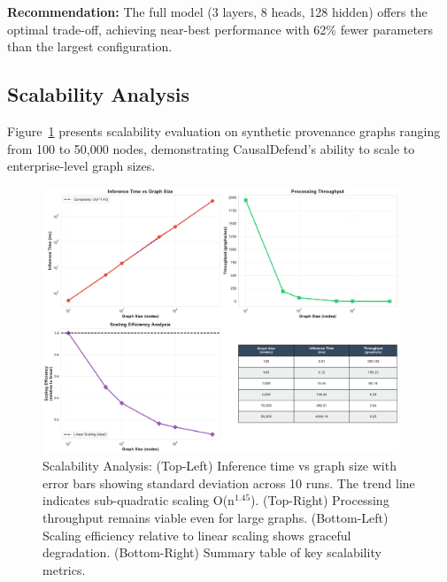 \documentclass[conference]{IEEEtran}
\begin{document}
\textbf{Recommendation:} The full model (3 layers, 8 heads, 128 hidden) offers the optimal trade-off, achieving near-best performance with 62\% fewer parameters than the largest configuration.

\subsection{Scalability Analysis}

Figure~\ref{fig:scalability} presents scalability evaluation on synthetic provenance graphs ranging from 100 to 50,000 nodes, demonstrating CausalDefend's ability to scale to enterprise-level graph sizes.

\begin{figure}[!t]
\centering
\includegraphics[width=0.95\textwidth]{experiments/results/scalability_analysis.pdf}
\caption{Scalability Analysis: (Top-Left) Inference time vs graph size with error bars showing standard deviation across 10 runs. The trend line indicates sub-quadratic scaling O(n$^{1.45}$). (Top-Right) Processing throughput remains viable even for large graphs. (Bottom-Left) Scaling efficiency relative to linear scaling shows graceful degradation. (Bottom-Right) Summary table of key scalability metrics.}
\label{fig:scalability}
\end{figure}
\end{document}
